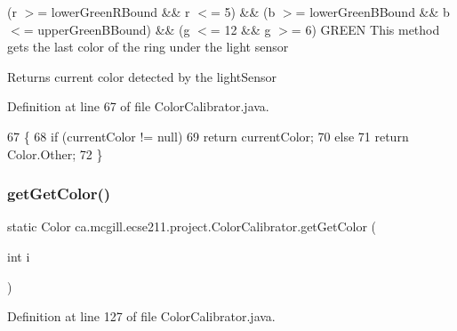 (r $>$= lower\+Green\+R\+Bound \&\& r $<$= 5) \&\& (b $>$= lower\+Green\+B\+Bound \&\& b $<$= upper\+Green\+B\+Bound) \&\& (g $<$= 12 \&\& g $>$= 6) G\+R\+E\+EN This method gets the last color of the ring under the light sensor

\begin{DoxyReturn}{Returns}
current color detected by the light\+Sensor 
\end{DoxyReturn}


Definition at line 67 of file Color\+Calibrator.\+java.


\begin{DoxyCode}
67                                  \{
68     \textcolor{keywordflow}{if} (currentColor != null)
69       \textcolor{keywordflow}{return} currentColor;
70     \textcolor{keywordflow}{else}
71       \textcolor{keywordflow}{return} Color.Other;
72   \}
\end{DoxyCode}
\mbox{\label{classca_1_1mcgill_1_1ecse211_1_1project_1_1_color_calibrator_acb1d9cef0739971dbe00cc16712be0fe}} 
\subsubsection{\texorpdfstring{get\+Get\+Color()}{getGetColor()}}
{\footnotesize\ttfamily static Color ca.\+mcgill.\+ecse211.\+project.\+Color\+Calibrator.\+get\+Get\+Color (\begin{DoxyParamCaption}\item[{int}]{i }\end{DoxyParamCaption})\hspace{0.3cm}{\ttfamily [static]}}



Definition at line 127 of file Color\+Calibrator.\+java.


